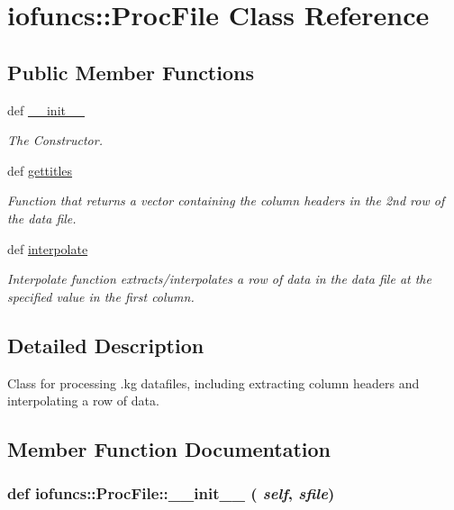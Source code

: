 \hypertarget{classiofuncs_1_1ProcFile}{
\section{iofuncs::ProcFile Class Reference}
\label{d3/d16/classiofuncs_1_1ProcFile}
}
\subsection*{Public Member Functions}
\begin{DoxyCompactItemize}
\item 
def \hyperlink{classiofuncs_1_1ProcFile_aaf57101eb0b922217a240ca283fc5d9d}{\_\-\_\-init\_\-\_\-}
\begin{DoxyCompactList}\small\item\em The Constructor. \item\end{DoxyCompactList}\item 
def \hyperlink{classiofuncs_1_1ProcFile_a88f142260af3fd70b1b8613da471f858}{gettitles}
\begin{DoxyCompactList}\small\item\em Function that returns a vector containing the column headers in the 2nd row of the data file. \item\end{DoxyCompactList}\item 
def \hyperlink{classiofuncs_1_1ProcFile_ae7f8d6213747a8d1e41b771ec71cd2be}{interpolate}
\begin{DoxyCompactList}\small\item\em Interpolate function extracts/interpolates a row of data in the data file at the specified value in the first column. \item\end{DoxyCompactList}\end{DoxyCompactItemize}


\subsection{Detailed Description}
\begin{DoxyVerb}Class for processing .kg datafiles, including extracting column headers and interpolating a row of data.\end{DoxyVerb}
 

\subsection{Member Function Documentation}
\hypertarget{classiofuncs_1_1ProcFile_aaf57101eb0b922217a240ca283fc5d9d}{
\subsubsection[{\_\-\_\-init\_\-\_\-}]{\setlength{\rightskip}{0pt plus 5cm}def iofuncs::ProcFile::\_\-\_\-init\_\-\_\- ( {\em self}, \/   {\em sfile})}}
\label{d3/d16/classiofuncs_1_1ProcFile_aaf57101eb0b922217a240ca283fc5d9d}


